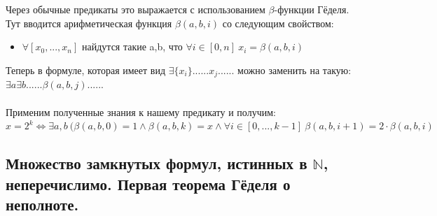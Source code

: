 \\
\\
Через обычные предикаты это выражается с использованием $\beta$-функции Гёделя. 
\\
Тут вводится арифметическая функция $\beta(a,b,i)$ со следующим свойством:
\begin{itemize}
    \item[] $\forall [x_0, ..., x_n]$ найдутся такие a,b, что $\forall i \in [0,n] \ x_i = \beta(a,b,i)$
\end{itemize}
Теперь в формуле, которая имеет вид $\exists \{x_i\} ......x_j......$ можно заменить на такую: $\exists a \exists b ......\beta(a,b,j)......$
\\
\\
Применим полученные знания к нашему предикату и получим:\\
$x = 2^k \Longleftrightarrow \exists a,b \ (\beta(a,b,0) = 1 \wedge \beta(a,b,k) = x \wedge \forall i \in [0,..., k-1] \ \beta(a,b,i+1) = 2\cdot \beta(a,b,i) $


\subsection{Множество замкнутых формул, истинных в $\mathbb N$, неперечислимо. Первая теорема Гёделя о неполноте.}

